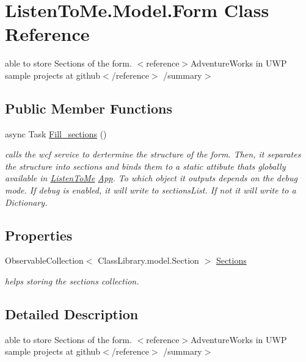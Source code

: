 \hypertarget{class_listen_to_me_1_1_model_1_1_form}{}\section{Listen\+To\+Me.\+Model.\+Form Class Reference}
\label{class_listen_to_me_1_1_model_1_1_form}


able to store Sections of the form. $<$reference$>$Adventure\+Works in U\+WP sample projects at github$<$/reference$>$ /summary$>$  


\subsection*{Public Member Functions}
\begin{DoxyCompactItemize}
\item 
async Task \hyperlink{class_listen_to_me_1_1_model_1_1_form_a97e6f2c705e11c7c99b8742d846d8738}{Fill\+\_\+sections} ()
\begin{DoxyCompactList}\small\item\em calls the wcf service to dertermine the structure of the form. Then, it separates the structure into sections and binds them to a static attibute that\textquotesingle{}s globally available in \hyperlink{namespace_listen_to_me}{Listen\+To\+Me} \hyperlink{class_listen_to_me_1_1_app}{App}. To which object it outputs depends on the debug mode. If debug is enabled, it will write to sections\+List. If not it will write to a Dictionary. \end{DoxyCompactList}\end{DoxyCompactItemize}
\subsection*{Properties}
\begin{DoxyCompactItemize}
\item 
Observable\+Collection$<$ Class\+Library.\+model.\+Section $>$ \hyperlink{class_listen_to_me_1_1_model_1_1_form_a5ecdd2a344e3e2e6157ff3c5b6dfc2d1}{Sections}
\begin{DoxyCompactList}\small\item\em helps storing the sections collection. \end{DoxyCompactList}\end{DoxyCompactItemize}


\subsection{Detailed Description}
able to store Sections of the form. $<$reference$>$Adventure\+Works in U\+WP sample projects at github$<$/reference$>$ /summary$>$ 

